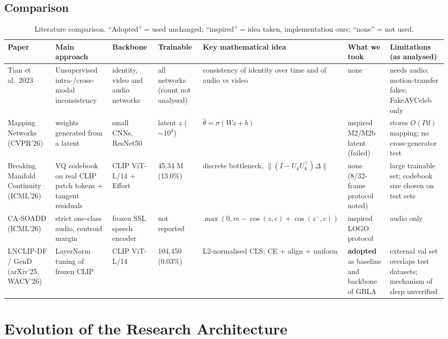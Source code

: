 \documentclass[10pt,a4paper]{article}
\begin{document}
\subsection{Comparison}
\begin{table}[H]\centering\scriptsize
\caption{Literature comparison. ``Adopted'' = used unchanged; ``inspired'' = idea taken, implementation ours; ``none'' = not used.}\label{tab:litcomp}
\begin{tabularx}{\linewidth}{@{}L{1.9cm}L{2.3cm}L{1.9cm}L{1.9cm}YL{2.3cm}Y@{}}
\toprule
Paper & Main approach & Backbone & Trainable & Key mathematical idea & What we took & Limitations (as analysed)\\
\midrule
Tian et al.\ 2023 & Unsupervised intra-/cross-modal inconsistency & identity, video and audio networks & all networks (count not analysed) & consistency of identity over time and of audio vs video & none & needs audio; motion-transfer fakes; FakeAVCeleb only\\
Mapping Networks (CVPR'26) & weights generated from a latent & small CNNs, ResNet50 & latent \(z\) (\(\sim10^3\)) & \(\hat\theta=\sigma(Wz+b)\) & inspired M2/M2b latent (failed) & stores \(O(Pd)\) mapping; no cross-generator test\\
Breaking Manifold Continuity (ICML'26) & VQ codebook on real CLIP patch tokens + tangent residuals & CLIP ViT-L/14 + Effort & 45.34 M (13.0\%) & discrete bottleneck, \(\|(I-U_kU_k^\top)\Delta\|\) & none (8/32-frame protocol noted) & large trainable set; codebook size chosen on test sets\\
CA-SOADD (ICML'26) & strict one-class audio, centroid margin & frozen SSL speech encoder & not reported & \(\max(0,m-\cos(z,c)+\cos(z^-,c))\) & inspired LOGO protocol & audio only\\
LNCLIP-DF / GenD (arXiv'25, WACV'26) & LayerNorm tuning of frozen CLIP & CLIP ViT-L/14 & 104,450 (0.03\%) & L2-normalised CLS; CE + align + uniform & \textbf{adopted} as baseline and backbone of GBLA & external val set overlaps test datasets; mechanism of slerp unverified\\
\bottomrule
\end{tabularx}
\end{table}

\section{Evolution of the Research Architecture}\label{sec:arch-evolution}
\end{document}
